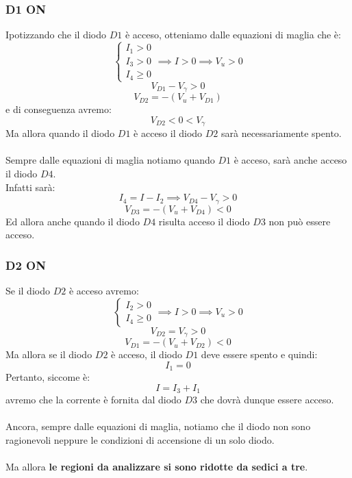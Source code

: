 \documentclass{article}
\numberwithin{equation}{subsection}
\begin{document}
	\subsubsection{D1 ON}
	Ipotizzando che il diodo $D1$ è acceso, otteniamo dalle equazioni di maglia che è:
	$$\begin{cases} I_1 > 0 \\ I_3 > 0 \\ I_4 \geq 0\end{cases} \implies I > 0 \implies V_u > 0$$
	$$V_{D1} - V_\gamma > 0$$
	$$V_{D2} = -(V_u + V_{D1})$$
	e di conseguenza avremo:
	$$V_{D2} < 0 < V_\gamma$$
	Ma allora quando il diodo $D1$ è acceso il diodo $D2$ sarà necessariamente spento.\\\\
	Sempre dalle equazioni di maglia notiamo quando $D1$ è acceso, sarà anche acceso il diodo $D4$. \\
	Infatti sarà:
	$$I_4 = I - I_2 \implies V_{D4} - V_\gamma > 0$$
	$$V_{D3} = -(V_u + V_{D4}) < 0$$
	Ed allora anche quando il diodo $D4$ risulta acceso il diodo $D3$ non può essere acceso.
	\subsubsection{D2 ON}
	Se il diodo $D2$ è acceso avremo:
	$$\begin{cases} I_2 > 0 \\ I_4 \geq 0 \end{cases} \implies I > 0 \implies V_u > 0$$
	$$V_{D2} = V_\gamma > 0$$
	$$V_{D1} = -(V_u + V_{D2}) < 0$$
	Ma allora se il diodo $D2$ è acceso, il diodo $D1$ deve essere spento e quindi:
	$$I_1 = 0$$
	Pertanto, siccome è:
	$$I = I_3 + I_1$$
	avremo che la corrente è fornita dal diodo $D3$ che dovrà dunque essere acceso.\\\\
	Ancora, sempre dalle equazioni di maglia, notiamo che il diodo non sono ragionevoli neppure le condizioni di accensione di un solo diodo.\\\\
	Ma allora \textbf{le regioni da analizzare si sono ridotte da sedici a tre}.
\end{document}
